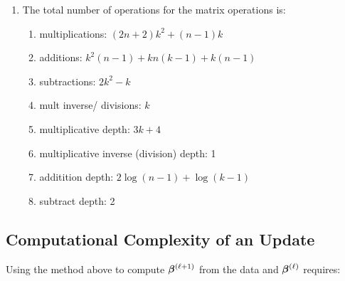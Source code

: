 \begin{enumerate}
\begin{enumerate}
		\item The total number of operations for the matrix operations is:
		\begin{enumerate}
			\item multiplications: 
			$(2n+2)k^{2} + (n-1)k $
			\item additions: $k^{2}(n-1) + kn(k-1) + k(n-1)$ 
			\item subtractions: $2k^{2} -k $ 
			\item mult inverse/ divisions: $k$
			\item multiplicative depth: $3k + 4 $
			\item multiplicative inverse (division) depth: 1
			\item additition depth: $ 2 \log(n-1) + \log(k-1)$ 
			\item subtract depth: 2
		\end{enumerate}
	\end{enumerate}

\end{enumerate}


\subsection{Computational Complexity of an Update}
Using the method above to compute $\coefficients{\step+1}$ from the data and $\coefficients{\step}$ requires:

